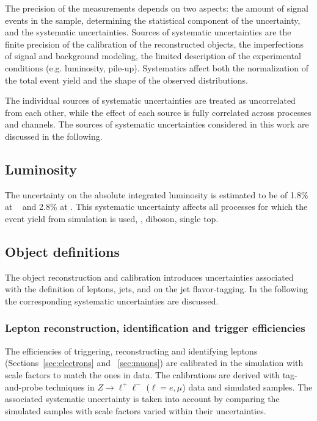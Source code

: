 The precision of the measurements depends on two aspects: the
amount of signal events in the sample, determining the statistical
component of the uncertainty, and the systematic uncertainties. 
Sources of systematic uncertainties are the finite precision of the
calibration of the reconstructed objects, the imperfections of signal
and background modeling, the limited description of the experimental
conditions (e.g. luminosity, pile-up).
Systematics affect both the normalization of the total event yield and the
shape of the observed distributions.

The individual sources of systematic uncertainties are treated as
uncorrelated from each other, while the effect of each source is fully
correlated across processes and channels.
The sources of systematic uncertainties considered in this work are
discussed in the following.

\subsection{Luminosity}
\label{sec:syst_lumi}
The uncertainty on the absolute integrated luminosity is estimated to be
of 1.8\% at \seventev{}~\cite{lumiunc} and 2.8\% at \eighttev{}. This
systematic uncertainty affects all processes for which the event yield
from simulation is used, \zjets{}, diboson, single top.

\subsection{Object definitions}
\label{sec:syst_objects}
The object reconstruction and calibration introduces uncertainties
associated with the definition of leptons, jets, \met{} and on the jet
flavor-tagging. In the following the corresponding systematic
uncertainties are discussed. 

\subsubsection{Lepton reconstruction, identification and trigger efficiencies}
\label{sec:syst_lepID}

The efficiencies of triggering, reconstructing and identifying leptons
(Sections~\ref{sec:electrons} and ~\ref{sec:muons})
are calibrated in the simulation with scale factors to match the ones
in data. The calibrations are derived with tag-and-probe techniques in
$Z\to \ell^+\ell^-$ ($\ell=e,\mu$) data and simulated samples. The
associated systematic uncertainty is taken into account by
comparing the simulated samples with scale factors varied within their
uncertainties.

